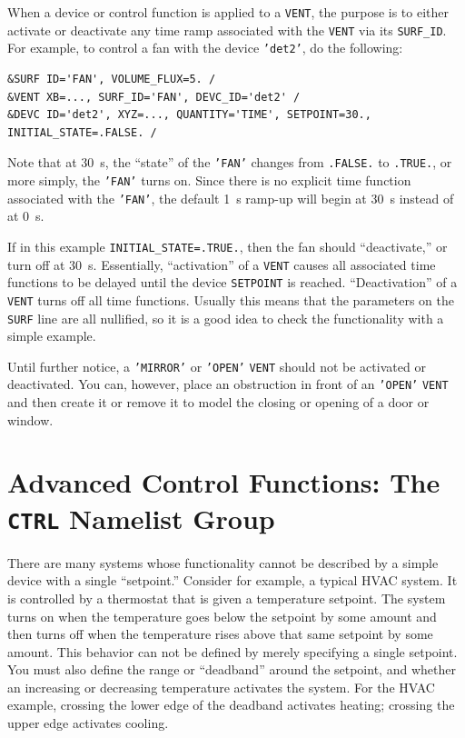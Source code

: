 \documentclass[11pt]{book}
\newcommand{\ct}{\tt\small}
\begin{document}
When a device or control function is applied to a {\ct VENT}, the purpose is to either activate or deactivate any time ramp associated with
the {\ct VENT} via its {\ct SURF\_ID}. For example, to control a fan with the device {\ct 'det2'}, do the following:

\footnotesize
\begin{verbatim}
&SURF ID='FAN', VOLUME_FLUX=5. /
&VENT XB=..., SURF_ID='FAN', DEVC_ID='det2' /
&DEVC ID='det2', XYZ=..., QUANTITY='TIME', SETPOINT=30., INITIAL_STATE=.FALSE. /
\end{verbatim}
\normalsize

\noindent
Note that at 30~s, the ``state'' of the {\ct 'FAN'} changes from {\ct .FALSE.} to {\ct .TRUE.}, or more simply, the {\ct 'FAN'} turns on. Since there
is no explicit time function associated with the {\ct 'FAN'}, the default 1~s ramp-up will begin at 30~s instead of at 0~s.

If in this example {\ct INITIAL\_STATE=.TRUE.}, then the fan should ``deactivate,'' or turn off at 30~s. Essentially, ``activation'' of a {\ct VENT} causes all associated
time functions to be delayed until the device {\ct SETPOINT} is reached. ``Deactivation'' of a {\ct VENT} turns off all time functions. Usually this means
that the parameters on the {\ct SURF} line are all nullified, so it is a good idea to check the functionality with a simple example.


\begin{warning}
Until further notice, a {\ct 'MIRROR'} or {\ct 'OPEN'} {\ct VENT} should not be activated or deactivated.
You can, however, place an obstruction in front of an {\ct 'OPEN'} {\ct VENT} and then create it or remove it to model the closing or opening of a door or
window.
\end{warning}



\newpage

\section{Advanced Control Functions: The \texorpdfstring{{\tt CTRL}}{CTRL} Namelist Group}
\label{info:CTRL}

There are many systems whose functionality cannot be described by a simple device with a single ``setpoint.''
Consider for example, a typical HVAC system.  It is controlled by a thermostat that is given a temperature setpoint.
The system turns on when the temperature goes below the setpoint by some
amount and then turns off when the temperature rises above that same setpoint by some amount.
This behavior can not be defined by merely specifying a single setpoint.
You must also define the range or ``deadband'' around the setpoint, and whether an
increasing or decreasing temperature activates the system.  For the HVAC example, crossing the
lower edge of the deadband activates heating; crossing the upper edge activates cooling.
\end{document}
